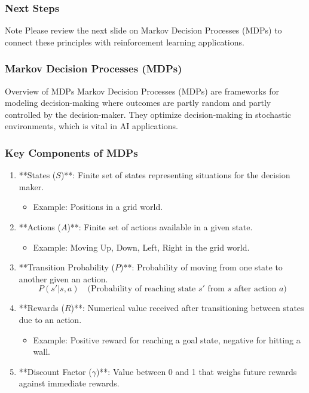 \documentclass[aspectratio=169]{beamer}
\begin{document}
\begin{frame}[fragile]
    \frametitle{Next Steps}
    \begin{block}{Note}
        Please review the next slide on Markov Decision Processes (MDPs) to connect these principles with reinforcement learning applications.
    \end{block}
\end{frame}

\begin{frame}[fragile]
    \frametitle{Markov Decision Processes (MDPs)}
    \begin{block}{Overview of MDPs}
        Markov Decision Processes (MDPs) are frameworks for modeling decision-making where outcomes are partly random and partly controlled by the decision-maker.
        They optimize decision-making in stochastic environments, which is vital in AI applications.
    \end{block}
\end{frame}

\begin{frame}[fragile]
    \frametitle{Key Components of MDPs}
    \begin{enumerate}
        \item **States ($S$)**: Finite set of states representing situations for the decision maker.
            \begin{itemize}
                \item Example: Positions in a grid world.
            \end{itemize}
        
        \item **Actions ($A$)**: Finite set of actions available in a given state.
            \begin{itemize}
                \item Example: Moving Up, Down, Left, Right in the grid world.
            \end{itemize}
        
        \item **Transition Probability ($P$)**: Probability of moving from one state to another given an action.
            \begin{equation}
                P(s' | s, a) \quad \text{(Probability of reaching state $s'$ from $s$ after action $a$)}
            \end{equation}
        
        \item **Rewards ($R$)**: Numerical value received after transitioning between states due to an action.
            \begin{itemize}
                \item Example: Positive reward for reaching a goal state, negative for hitting a wall.
            \end{itemize}
        
        \item **Discount Factor ($\gamma$)**: Value between 0 and 1 that weighs future rewards against immediate rewards.
    \end{enumerate}
\end{frame}
\end{document}
